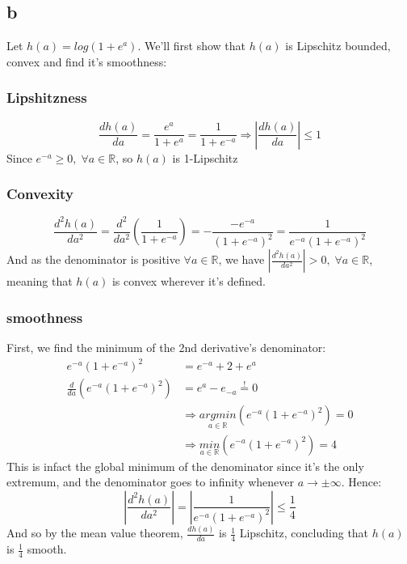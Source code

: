 \subsection*{b}
Let $h(a) = log(1 + e^a)$. We'll first show that $h(a)$ is Lipschitz bounded, convex and find it's smoothness:

\subsubsection*{Lipshitzness}
\begin{equation*}
    \frac{dh(a)}{da} = \frac{e^a}{1+e^a}  = \frac{1}{1+e^{-a}} \Rightarrow |\frac{dh(a)}{da}| \leq 1
\end{equation*}
Since $e^{-a} \geq 0, \; \forall a\in \mathbb{R}$, so $h(a)$ is 1-Lipschitz

\subsubsection*{Convexity}
\begin{equation*}
    \frac{d^2h(a)}{da^2} = \frac{d^2}{da^2} \left(\frac{1}{1+e^{-a}}\right) = -\frac{-e^{-a}}{(1+e^{-a})^2} = 
    \frac{1}{e^{-a}(1+e^{-a})^2}
\end{equation*}
And as the denominator is positive $\forall a\in \mathbb{R}$, we have $|\frac{d^2h(a)}{da^2}| > 0, \; \forall a\in \mathbb{R}$, meaning that $h(a)$ is convex wherever it's defined.

\subsubsection*{smoothness}
First, we find the minimum of the 2nd derivative's denominator:
\begin{equation*}
    \begin{split}
        e^{-a}(1+e^{-a})^2 &= e^{-a} + 2 + e^a \\
        \frac{d}{da}(e^{-a}(1+e^{-a})^2) &= e^a - e_{-a} \overset{!}{=} 0 \\
        &\Rightarrow \underset{a\in \mathbb{R}}{argmin} (e^{-a}(1+e^{-a})^2) = 0 \\
        &\Rightarrow \underset{a\in \mathbb{R}}{min} (e^{-a}(1+e^{-a})^2) = 4
    \end{split}
\end{equation*}
This is infact the global minimum of the denominator since it's the only extremum, and the denominator goes to infinity whenever $a\rightarrow \pm \infty$. Hence:
\begin{equation*}
    |\frac{d^2h(a)}{da^2}| = |\frac{1}{e^{-a}(1+e^{-a})^2}| \leq \frac{1}{4}
\end{equation*}
And so by the mean value theorem, $\frac{dh(a)}{da}$ is $\frac{1}{4}$ Lipschitz, concluding that $h(a)$ is $\frac{1}{4}$ smooth.

